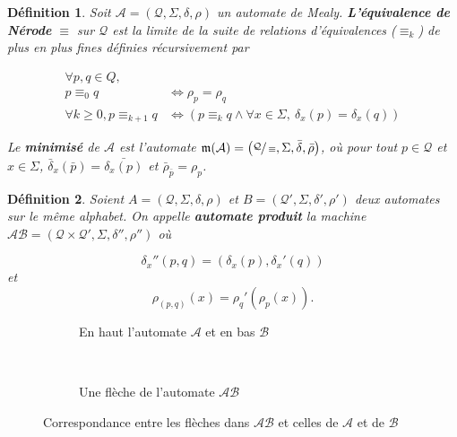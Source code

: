 \documentclass[11pt,a4paper]{article}
\newtheorem{definition}{Définition}
\begin{document}
\begin{definition}
  Soit $\mathcal{A}=\left(\mathcal{Q}, \Sigma, \delta, \rho\right)$ un automate de Mealy. \textbf{L'équivalence de Nérode} $\equiv$ sur $\mathcal{Q}$ est la limite de la suite de relations d'équivalences ($\equiv_k$) de plus en plus fines définies récursivement par

  \begin{align*}
    \forall p, q \in Q,\\
    p \equiv_0 q &\iff \rho_p = \rho_q \\
    \forall k \geq 0, p \equiv_{k+1}q &\iff \left(p\equiv_kq \wedge \forall x \in \Sigma,~\delta_x(p)=\delta_x(q)\right)
  \end{align*}

  Le \textbf{minimisé} de $\mathcal{A}$ est l'automate $\mathfrak{m}(\mathcal{A})=\left(\sfrac{\mathcal{Q}}{\equiv}, \Sigma, \bar{\delta}, \bar{\rho}\right)$, où pour tout $p\in\mathcal{Q}$ et $x\in\Sigma$, $\bar{\delta}_x(\bar{p}) = \bar{\delta_x(p)}$ et $\bar{\rho}_{\bar{p}} =  \rho_p$.
\end{definition}

\begin{definition}
  \label{def:produit}
  Soient $A = \left(\mathcal{Q}, \Sigma, \delta, \rho\right)$ et $B = \left(\mathcal{Q'}, \Sigma, \delta', \rho'\right)$ deux automates sur le même alphabet. On appelle \textbf{\textit{automate produit}} la machine $\mathcal{AB} = \left(\mathcal{Q}\times\mathcal{Q'}, \Sigma, \delta'', \rho''\right)$ où

\[ \delta_x''(p, q) = (\delta_x(p), \delta_x'(q))\]
et
\[ \rho_{(p,q)}(x) = \rho_q'(\rho_p(x)). \]
\end{definition}

\begin{figure}[h!]
  \begin{subfigure}[b]{0.5\textwidth}
    \centering
    \caption{En haut l'automate $\mathcal{A}$ et en bas $\mathcal{B}$}
  \end{subfigure}
  ~
  \begin{subfigure}[b]{0.5\textwidth}
    \centering
    \caption{Une flèche de l'automate $\mathcal{AB}$}
  \end{subfigure}
  \caption{Correspondance entre les flèches dans $\mathcal{AB}$ et celles de $\mathcal{A}$ et de $\mathcal{B}$}
\end{figure}
\end{document}
